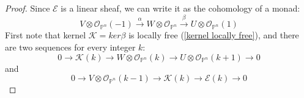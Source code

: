 \documentclass[
	oldfontcommands,
	sumario=abnt-6027-2012,
	12pt,			%
	openright,		%
	oneside,		%
	a4paper,		%
	english,		%
	brazil			%
	]{imecc-unicamp}
\begin{document}
\begin{proof}
Since $\mathcal{E}$ is a linear sheaf, we can write it as the cohomology of a monad:
\begin{equation}
V \otimes \mathcal{O}_{\mathbb{P}^n}(-1) \overset{ \alpha}{\to} W \otimes \mathcal{O}_{\mathbb{P}^n} \overset{ \beta}{\to} U \otimes \mathcal{O}_{\mathbb{P}^n}(1)
\end{equation}
First note that kernel $\mathcal{K}=ker \beta$ is locally free (\ref{kernel locally free}), and there are two sequences for every integer $k$:
\begin{equation}
0 \to \mathcal{K}(k) \to W \otimes \mathcal{O}_{\mathbb{P}^n}(k) \to U \otimes \mathcal{O}_{\mathbb{P}^n}(k+1) \to 0
\end{equation}
and
\begin{equation}
0 \to V \otimes \mathcal{O}_{\mathbb{P}^n}(k-1) \to \mathcal{K}(k) \to \mathcal{E}(k) \to 0
\end{equation}


\end{proof}
\end{document}
